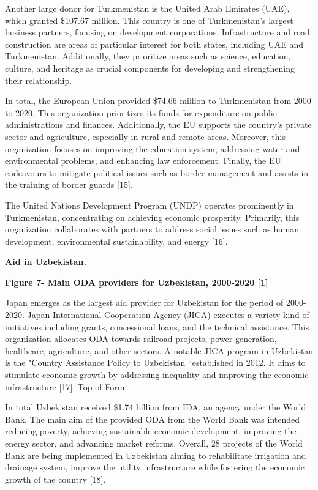 Another large donor for Turkmenistan is the United Arab Emirates (UAE),
which granted \$107.67 million. This country is one of Turkmenistan's
largest business partners, focusing on development corporations.
Infrastructure and road construction are areas of particular interest
for both states, including UAE and Turkmenistan. Additionally, they
prioritize areas such as science, education, culture, and heritage as
crucial components for developing and strengthening their relationship.

In total, the European Union provided \$74.66 million to Turkmenistan
from 2000 to 2020. This organization prioritizes its funds for
expenditure on public administrations and finances. Additionally, the EU
supports the country's private sector and agriculture, especially in
rural and remote areas. Moreover, this organization focuses on improving
the education system, addressing water and environmental problems, and
enhancing law enforcement. Finally, the EU endeavours to mitigate
political issues such as border management and assists in the training
of border guards {[}15{]}.

The United Nations Development Program (UNDP) operates prominently in
Turkmenistan, concentrating on achieving economic prosperity. Primarily,
this organization collaborates with partners to address social issues
such as human development, environmental sustainability, and energy
{[}16{]}.

{\bfseries Aid in Uzbekistan.}

{\bfseries Figure 7- Main ODA providers for Uzbekistan, 2000-2020 {[}1{]}}

Japan emerges as the largest aid provider for Uzbekistan for the period
of 2000-2020. Japan International Cooperation Agency (JICA) executes a
variety kind of initiatives including grants, concessional loans, and
the technical assistance. This organization allocates ODA towards
railroad projects, power generation, healthcare, agriculture, and other
sectors. A notable JICA program in Uzbekistan is the "Country Assistance
Policy to Uzbekistan ``established in 2012. It aims to stimulate
economic growth by addressing inequality and improving the economic
infrastructure {[}17{]}. Top of Form

In total Uzbekistan received \$1.74 billion from IDA, an agency under
the World Bank. The main aim of the provided ODA from the World Bank was
intended reducing poverty, achieving sustainable economic development,
improving the energy sector, and advancing market reforms. Overall, 28
projects of the World Bank are being implemented in Uzbekistan aiming to
rehabilitate irrigation and drainage system, improve the utility
infrastructure while fostering the economic growth of the country
{[}18{]}.

